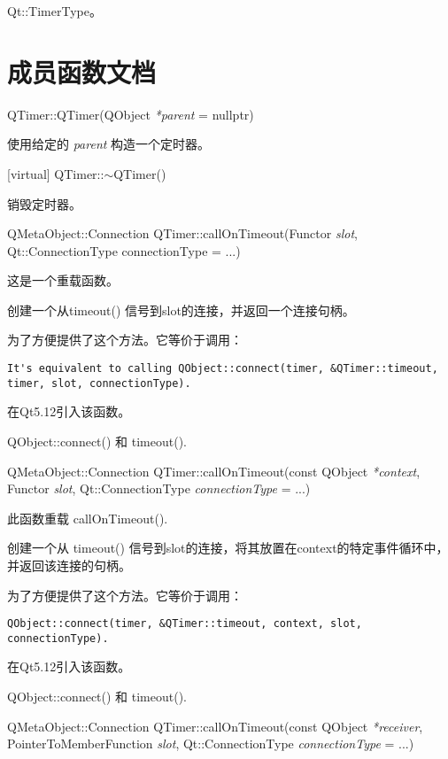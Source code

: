 \begin{seeAlso}
Qt::TimerType。
\end{seeAlso}

\section{成员函数文档}

QTimer::QTimer(QObject \emph{*parent} = nullptr)

使用给定的 \emph{parent} 构造一个定时器。

[virtual] QTimer::$\sim$QTimer()

销毁定时器。

QMetaObject::Connection QTimer::callOnTimeout(Functor \emph{slot}, Qt::ConnectionType connectionType = ...)

这是一个重载函数。

创建一个从timeout() 信号到slot的连接，并返回一个连接句柄。

为了方便提供了这个方法。它等价于调用：

\begin{lstlisting}
It's equivalent to calling QObject::connect(timer, &QTimer::timeout, timer, slot, connectionType).
\end{lstlisting}

在Qt5.12引入该函数。

\begin{seeAlso}
QObject::connect() 和 timeout().
\end{seeAlso}

QMetaObject::Connection QTimer::callOnTimeout(const QObject \emph{*context}, Functor \emph{slot}, Qt::ConnectionType \emph{connectionType} = ...)

此函数重载 callOnTimeout().

创建一个从 timeout() 信号到slot的连接，将其放置在context的特定事件循环中，并返回该连接的句柄。

为了方便提供了这个方法。它等价于调用：


\begin{lstlisting}
QObject::connect(timer, &QTimer::timeout, context, slot, connectionType).
\end{lstlisting}
	
在Qt5.12引入该函数。
	
\begin{seeAlso}
QObject::connect() 和 timeout().
\end{seeAlso}

QMetaObject::Connection QTimer::callOnTimeout(const QObject \emph{*receiver}, PointerToMemberFunction \emph{slot}, Qt::ConnectionType \emph{connectionType} = ...)

